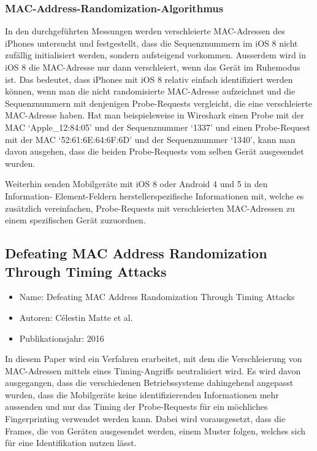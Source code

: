 \subsubsection*{MAC-Address-Randomization-Algorithmus}
In den durchgeführten Messungen werden verschleierte MAC-Adressen des iPhones
untersucht und festgestellt, dass die Sequenznummern im iOS 8 nicht zufällig
initialisiert werden, sondern aufsteigend vorkommen.
Ausserdem wird in iOS 8 die MAC-Adresse nur dann verschleiert, wenn das Gerät 
im Ruhemodus ist. 
Das bedeutet, dass iPhones mit iOS 8 relativ einfach identifiziert werden können,
wenn man die nicht randomisierte MAC-Adresse aufzeichnet und die 
Sequenznummern mit denjenigen Probe-Requests vergleicht, die eine verschleierte
MAC-Adresse haben. Hat man beispielsweise in Wireshark einen Probe mit der 
MAC `Apple\_12:84:05' und der Sequenznummer `1337' und einen Probe-Request 
mit der MAC `52:61:6E:64:6F:6D' und der Sequenznummer `1340', kann man davon 
ausgehen, dass die beiden Probe-Requests vom selben Gerät ausgesendet wurden.

Weiterhin senden Mobilgeräte mit iOS 8 oder Android 4 und 5 in den Information-
Element-Feldern herstellerspezifische Informationen mit, welche es zusätzlich
vereinfachen, Probe-Requests mit verschleierten MAC-Adressen zu einem spezifischen
Gerät zuzuordnen.

\clearpage

\subsection{Defeating MAC Address Randomization Through Timing Attacks}
\begin{itemize}
    \item Name: Defeating MAC Address Randomization Through Timing Attacks
    \item Autoren: Célestin Matte et al.
    \item Publikationsjahr: 2016
\end{itemize}
In diesem Paper wird ein Verfahren erarbeitet, mit dem die Verschleierung
von MAC-Adressen mittels eines Timing-Angriffs neutralisiert wird.
Es wird davon ausgegangen, dass die verschiedenen Betriebssysteme dahingehend
angepasst wurden, dass die Mobilgeräte keine identifizierenden Informationen 
mehr aussenden und nur das Timing der Probe-Requests für ein möchliches 
Fingerprinting verwendet werden kann.
Dabei wird vorausgesetzt, dass die Frames, die von Geräten ausgesendet
werden, einem Muster folgen, welches sich für eine Identifikation nutzen lässt.

